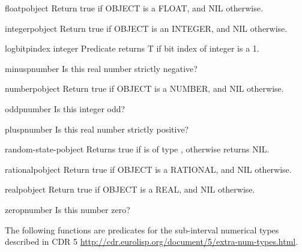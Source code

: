 \documentclass[10pt,english]{book}
\begin{document}
\begin{function}{floatp}{object}
  Return true if OBJECT is a FLOAT, and NIL otherwise.
\end{function}

\begin{function}{integerp}{object}
  Return true if OBJECT is an INTEGER, and NIL otherwise.
\end{function}

\begin{function}{logbitp}{index integer}
  Predicate returns T if bit index of integer is a 1.
\end{function}

\begin{function}{minusp}{number}
  Is this real number strictly negative?
\end{function}

\begin{function}{numberp}{object}
  Return true if OBJECT is a NUMBER, and NIL otherwise.
\end{function}

\begin{function}{oddp}{number}
  Is this integer odd?
\end{function}

\begin{function}{plusp}{number}
  Is this real number strictly positive?
\end{function}

\begin{function}{random-state-p}{object}
  Returns true if  is of type ,
  otherwise returns NIL.
\end{function}

\begin{function}{rationalp}{object}
  Return true if OBJECT is a RATIONAL, and NIL otherwise.
\end{function}

\begin{function}{realp}{object}
  Return true if OBJECT is a REAL, and NIL otherwise.
\end{function}

\begin{function}{zerop}{number}
  Is this number zero?
\end{function}

The following functions are predicates for the sub-interval numerical
types described in CDR 5
\url{http://cdr.eurolisp.org/document/5/extra-num-types.html}.
\end{document}
